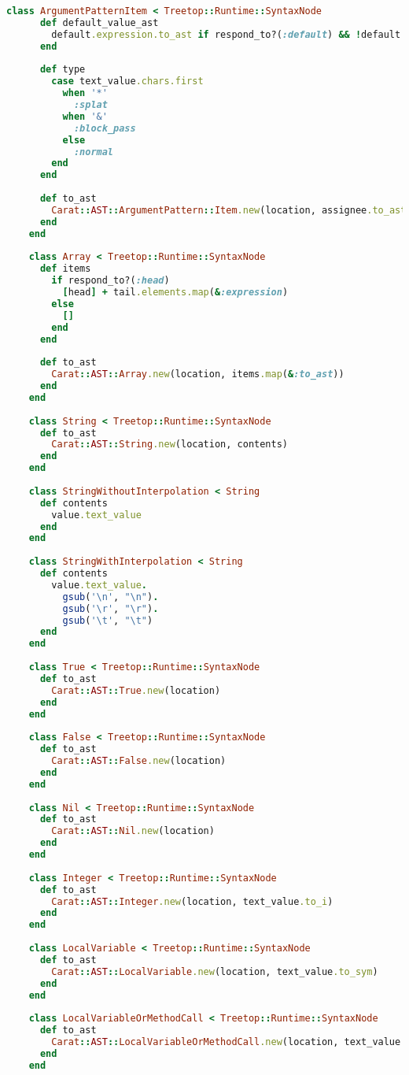 \begin{lstlisting}[title={\small\Helvetica parser/nodes.rb},language=Ruby]
    class ArgumentPatternItem < Treetop::Runtime::SyntaxNode
      def default_value_ast
        default.expression.to_ast if respond_to?(:default) && !default.empty?
      end
      
      def type
        case text_value.chars.first
          when '*'
            :splat
          when '&'
            :block_pass
          else
            :normal
        end
      end
      
      def to_ast
        Carat::AST::ArgumentPattern::Item.new(location, assignee.to_ast, type, default_value_ast)
      end
    end
    
    class Array < Treetop::Runtime::SyntaxNode
      def items
        if respond_to?(:head)
          [head] + tail.elements.map(&:expression)
        else
          []
        end
      end
      
      def to_ast
        Carat::AST::Array.new(location, items.map(&:to_ast))
      end
    end
    
    class String < Treetop::Runtime::SyntaxNode
      def to_ast
        Carat::AST::String.new(location, contents)
      end
    end
    
    class StringWithoutInterpolation < String
      def contents
        value.text_value
      end
    end
    
    class StringWithInterpolation < String
      def contents
        value.text_value.
          gsub('\n', "\n").
          gsub('\r', "\r").
          gsub('\t', "\t")
      end
    end
    
    class True < Treetop::Runtime::SyntaxNode
      def to_ast
        Carat::AST::True.new(location)
      end
    end
    
    class False < Treetop::Runtime::SyntaxNode
      def to_ast
        Carat::AST::False.new(location)
      end
    end
    
    class Nil < Treetop::Runtime::SyntaxNode
      def to_ast
        Carat::AST::Nil.new(location)
      end
    end
    
    class Integer < Treetop::Runtime::SyntaxNode
      def to_ast
        Carat::AST::Integer.new(location, text_value.to_i)
      end
    end
    
    class LocalVariable < Treetop::Runtime::SyntaxNode
      def to_ast
        Carat::AST::LocalVariable.new(location, text_value.to_sym)
      end
    end
    
    class LocalVariableOrMethodCall < Treetop::Runtime::SyntaxNode
      def to_ast
        Carat::AST::LocalVariableOrMethodCall.new(location, text_value.to_sym)
      end
    end
    

\end{lstlisting}
